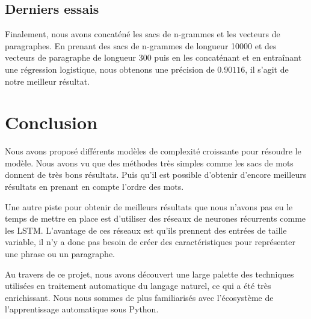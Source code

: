 \documentclass{article}
\begin{document}
\subsection{Derniers essais}

Finalement, nous avons concaténé les sacs de n-grammes et les vecteurs de paragraphes. En prenant des sacs de n-grammes de longueur 10000 et des vecteurs de paragraphe de longueur 300 puis en les concaténant et en entraînant une régression logistique, nous obtenons une précision de $0.90116$, il s'agit de notre meilleur résultat.

\section{Conclusion}

Nous avons proposé différents modèles de complexité croissante pour résoudre le modèle. Nous avons vu que des méthodes très simples comme les sacs de mots donnent de très bons résultats. Puis qu'il est possible d'obtenir d'encore meilleurs résultats en prenant en compte l'ordre des mots.

Une autre piste pour obtenir de meilleurs résultats que nous n'avons pas eu le temps de mettre en place est d'utiliser des réseaux de neurones récurrents comme les LSTM. L'avantage de ces réseaux est qu'ils prennent des entrées de taille variable, il n'y a donc pas besoin de créer des caractéristiques pour représenter une phrase ou un paragraphe.

Au travers de ce projet, nous avons découvert une large palette des techniques utilisées en traitement automatique du langage naturel, ce qui a été très enrichissant. Nous nous sommes de plus familiarisés avec l'écosystème de l'apprentissage automatique sous Python.

\clearpage



\end{document}
